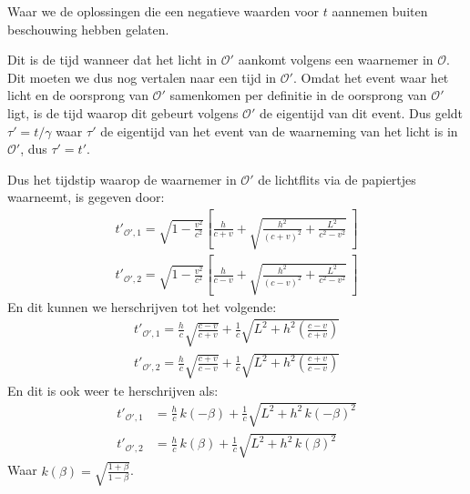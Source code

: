 \documentclass[12pt, dutch, a4paper]{article}
\begin{document}
\begin{enumerate}[(a).]
    Waar we de oplossingen die een negatieve waarden voor $t$ aannemen buiten beschouwing
    hebben gelaten.

    Dit is de tijd wanneer dat het licht in $\mathcal{O}'$ aankomt volgens een waarnemer in $\mathcal{O}$.
    Dit moeten we dus nog vertalen naar een tijd in $\mathcal{O}'$.
    Omdat het event waar het licht en de oorsprong van $\mathcal{O}'$ samenkomen per definitie
    in de oorsprong van $\mathcal{O}'$ ligt, 
    is de tijd waarop dit gebeurt volgens $\mathcal{O}'$ de eigentijd van dit event.
    Dus geldt $\tau' = t / \gamma$ 
    waar $\tau'$ de eigentijd van het event van de waarneming van het licht is in $\mathcal{O}'$, dus
    $\tau' = t'$.

    Dus het tijdstip waarop de waarnemer in $\mathcal{O}'$
    de lichtflits via de papiertjes waarneemt, is gegeven door:
    \begin{equation} 
        \begin{split}
            t'_{\mathcal{O}',1} = \sqrt{1 - \frac{v^2}{c^2}} \left[\frac{h}{c + v} +
            \sqrt{\frac{h^{2}}{\left(c + v\right)^{2}}+\frac{L^{2}}{c^{2}- v^{2}}}\: \right]\\
            t'_{\mathcal{O}',2} = \sqrt{1 - \frac{v^2}{c^2}} \left[\frac{h}{c-v}+
            \sqrt{\frac{h^{2}}{\left(c-v\right)^{2}}+\frac{L^{2}}{c^{2}-v^{2}}}\: \right]
        \end{split}
    \end{equation} 
    En dit kunnen we herschrijven tot het volgende:
    \begin{equation} \label{eq8}
        \begin{split}
            t'_{\mathcal{O}',1} = \frac{h}{c}\sqrt{\frac{c-v}{c+v}}+
            \frac{1}{c}\sqrt{L^{2} + h^{2}\left(\frac{c-v}{c+v}\right)}\\
            t'_{\mathcal{O}',2} = \frac{h}{c}\sqrt{\frac{c+v}{c-v}}+
            \frac{1}{c}\sqrt{L^{2} + h^{2}\left(\frac{c+v}{c-v}\right)}
        \end{split}
    \end{equation}
    En dit is ook weer te herschrijven als:
    \begin{equation}
        \begin{split}
            t'_{\mathcal{O}',1} &= \frac{h}{c} \, k(-\beta)+
            \frac{1}{c}\sqrt{L^{2} + h^2\,k(-\beta)^2}\\
            t'_{\mathcal{O}',2} &= \frac{h}{c} \, k(\beta)+
            \frac{1}{c}\sqrt{L^{2} + h^2\,k(\beta)^2}
        \end{split}
    \end{equation}
    Waar $k(\beta) = \sqrt{\frac{1+\beta}{1-\beta}}$.


\end{enumerate}
\end{document}
